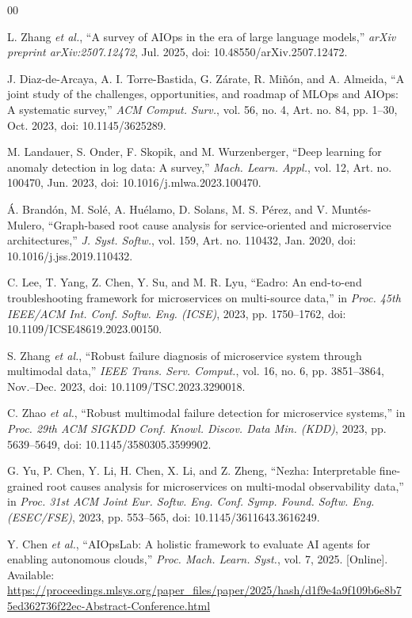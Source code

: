 \documentclass[conference]{IEEEtran}
\begin{document}
\begin{thebibliography}{00}

 L. Zhang \textit{et al.}, ``A survey of AIOps in the era of large language models,'' \textit{arXiv preprint arXiv:2507.12472}, Jul. 2025, doi: 10.48550/arXiv.2507.12472.

 J. Diaz-de-Arcaya, A. I. Torre-Bastida, G. Zárate, R. Miñón, and A. Almeida, ``A joint study of the challenges, opportunities, and roadmap of MLOps and AIOps: A systematic survey,'' \textit{ACM Comput. Surv.}, vol. 56, no. 4, Art. no. 84, pp. 1--30, Oct. 2023, doi: 10.1145/3625289.

 M. Landauer, S. Onder, F. Skopik, and M. Wurzenberger, ``Deep learning for anomaly detection in log data: A survey,'' \textit{Mach. Learn. Appl.}, vol. 12, Art. no. 100470, Jun. 2023, doi: 10.1016/j.mlwa.2023.100470.

 Á. Brandón, M. Solé, A. Huélamo, D. Solans, M. S. Pérez, and V. Muntés-Mulero, ``Graph-based root cause analysis for service-oriented and microservice architectures,'' \textit{J. Syst. Softw.}, vol. 159, Art. no. 110432, Jan. 2020, doi: 10.1016/j.jss.2019.110432.

 C. Lee, T. Yang, Z. Chen, Y. Su, and M. R. Lyu, ``Eadro: An end-to-end troubleshooting framework for microservices on multi-source data,'' in \textit{Proc. 45th IEEE/ACM Int. Conf. Softw. Eng. (ICSE)}, 2023, pp. 1750--1762, doi: 10.1109/ICSE48619.2023.00150.

 S. Zhang \textit{et al.}, ``Robust failure diagnosis of microservice system through multimodal data,'' \textit{IEEE Trans. Serv. Comput.}, vol. 16, no. 6, pp. 3851--3864, Nov.--Dec. 2023, doi: 10.1109/TSC.2023.3290018.

 C. Zhao \textit{et al.}, ``Robust multimodal failure detection for microservice systems,'' in \textit{Proc. 29th ACM SIGKDD Conf. Knowl. Discov. Data Min. (KDD)}, 2023, pp. 5639--5649, doi: 10.1145/3580305.3599902.

 G. Yu, P. Chen, Y. Li, H. Chen, X. Li, and Z. Zheng, ``Nezha: Interpretable fine-grained root causes analysis for microservices on multi-modal observability data,'' in \textit{Proc. 31st ACM Joint Eur. Softw. Eng. Conf. Symp. Found. Softw. Eng. (ESEC/FSE)}, 2023, pp. 553--565, doi: 10.1145/3611643.3616249.

 Y. Chen \textit{et al.}, ``AIOpsLab: A holistic framework to evaluate AI agents for enabling autonomous clouds,'' \textit{Proc. Mach. Learn. Syst.}, vol. 7, 2025. [Online]. Available: \url{https://proceedings.mlsys.org/paper_files/paper/2025/hash/d1f9e4a9f109b6e8b75ed362736f22ec-Abstract-Conference.html}


\end{thebibliography}
\end{document}

